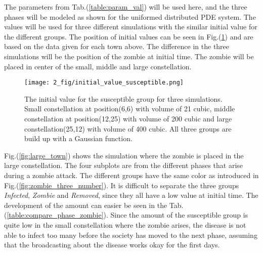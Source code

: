 \documentclass[%
twoside,                 %
final,                   %
chapterprefix=true,      %
open=right               %
10pt]{book}
\begin{document}
The parameters from Tab.(\ref{table:param_val}) will be used here, and the three phases will be modeled as shown for the uniformed distributed PDE system. The values will be used for three different simulations with the similar initial value for the different groups. The position of initial values can be seen in Fig.(\ref{fig:initial_value_susceptible}) and are based on the data given for each town above. The difference in the three simulations will be the position of the zombie at initial time. The zombie will be placed in center of the small, middle and large constellation.


\begin{figure}[ht]
  \centerline{\texttt{[image: 2\_fig/initial\_value\_susceptible.png]}}
  \caption{
  \label{fig:initial_value_susceptible} The initial value for the susceptible group for three simulations. Small constellation at position(6,6) with volume of 21 cubic, middle constellation at position(12,25) with volume of 200 cubic and large constellation(25,12) with volume of 400 cubic. All three groups are build up with a Gaussian function.
  }
\end{figure}




\vspace{3mm}




\vspace{3mm}


Fig.(\ref{fig:large_town}) shows the simulation where the zombie is placed in the large constellation. The four subplots are from the different phases that arise during a zombie attack. The different groups have the same color as introduced in Fig.(\ref{fig:zombie_three_number}). It is difficult to separate the three groups \emph{Infected}, \emph{Zombie} and \emph{Removed}, since they all have a low value at initial time. The development of the amount can easier be seen in the Tab.(\ref{table:compare_phase_zombie}). Since the amount of the susceptible group is quite low in the small constellation where the zombie arises, the disease is not able to infect too many before the society has moved to the next phase, assuming that the broadcasting about the disease works okay for the first days. 


\vspace{3mm}




\vspace{3mm}
\end{document}
